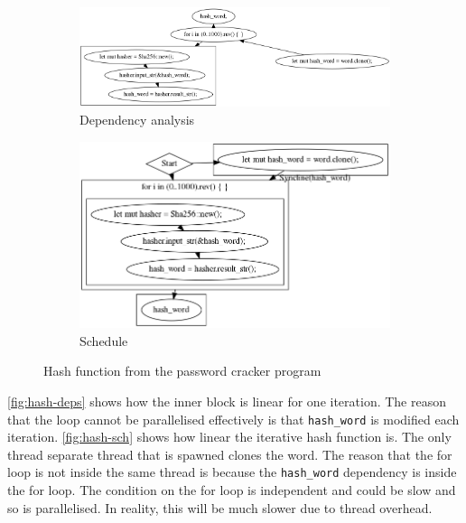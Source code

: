 \begin{figure}
    \begin{subfigure}{0.6\textwidth}
        \centering
        \includegraphics[width=\textwidth]{img/password-cracker/hash-dependency-analysis.png}
        \caption{\label{fig:hash-deps}Dependency analysis}
    \end{subfigure}
    \begin{subfigure}{0.4\textwidth}
        \centering
        \includegraphics[width=\textwidth]{img/password-cracker/hash-schedule.png}
        \caption{Schedule}
    \end{subfigure}
    \caption{\label{fig:hash-sch}Hash function from the password cracker program}
\end{figure}

\autoref{fig:hash-deps} shows how the inner block is linear for one iteration. The reason that the loop cannot be parallelised effectively is that \texttt{hash\_word} is modified each iteration.
\autoref{fig:hash-sch} shows how linear the iterative hash function is. The only thread separate thread that is spawned clones the word. The reason that the for loop is not inside the same thread is because the \texttt{hash\_word} dependency is inside the for loop. The condition on the for loop is independent and could be slow and so is parallelised. In reality, this will be much slower due to thread overhead.

